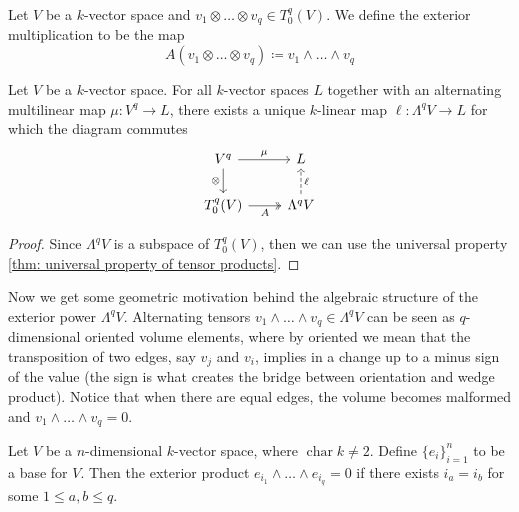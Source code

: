 \begin{definition}
    \label{def: exterior multiplication}
    Let \(V\) be a \(k\)-vector space and \(v_1 \otimes \dots \otimes v_q \in
    T_0^q(V)\). We define the exterior multiplication to be the map
    \[
        A(v_1 \otimes \dots \otimes v_q) \coloneqq v_1 \wedge \dots \wedge v_q
    \]
\end{definition}

\begin{proposition}
    \label{prop: exterior power universal property}
    Let \(V\) be a \(k\)-vector space. For all \(k\)-vector spaces \(L\) together
    with an alternating multilinear map \(\mu: V^q \to L\), there exists a unique
    \(k\)-linear map \(\ell: \Lambda^q V \to L\) for which the diagram commutes
    \[
        \begin{tikzcd}
            V^q \ar[d, swap, "\otimes"] \ar[r, "\mu"]  &L \\
            T_0^q(V) \ar[r, swap, two heads, "A"]
            &\Lambda^q V \ar[u, dashed, swap, "\ell"]
        \end{tikzcd}
    \]
\end{proposition}

\begin{proof}
    Since \(\Lambda^q V\) is a subspace of \(T_0^q(V)\), then we can use the
    universal property \cref{thm: universal property of tensor products}.
\end{proof}

Now we get some geometric motivation behind the algebraic structure of the
exterior power \(\Lambda^q V\). Alternating tensors \(v_1 \wedge \dots \wedge
v_q \in \Lambda^q V\) can be seen as \(q\)-dimensional oriented volume elements,
where by oriented we mean that the transposition of two edges, say \(v_j\) and
\(v_i\), implies in a change up to a minus sign of the value (the sign is what
creates the bridge between orientation and wedge product). Notice that when
there are equal edges, the volume becomes malformed and \(v_1 \wedge \dots
\wedge v_q = 0\).

\begin{proposition}
    Let \(V\) be a \(n\)-dimensional \(k\)-vector space, where
    \(\operatorname{char} k \neq 2\). Define \(\{e_i\}_{i=1}^n\) to be a base for
    \(V\). Then the exterior product \(e_{i_1} \wedge \dots \wedge e_{i_q} = 0\)
    if there exists \(i_a = i_b\) for some \(1 \leq a, b \leq q\).
\end{proposition}

